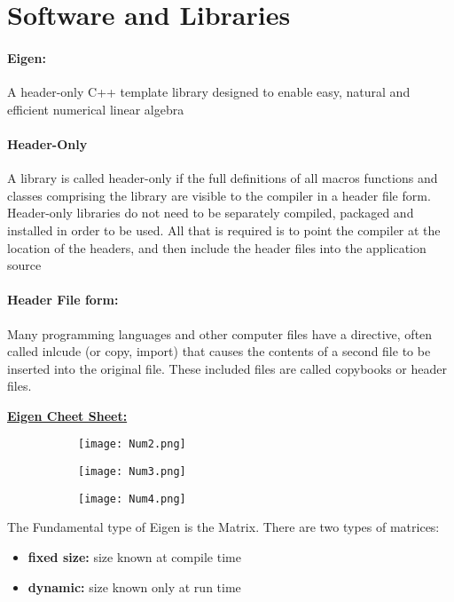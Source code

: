 \documentclass[8pt]{extreport}
\begin{document}
\section{Software and Libraries}

\paragraph{Eigen:} A header-only C++ template library designed to enable easy, natural and efficient numerical linear algebra

\paragraph{Header-Only} A library is called header-only if the full definitions of all macros functions and classes comprising the library are visible to the compiler in a header file form. Header-only libraries do not need to be separately compiled, packaged and installed in order to be used. All that is required is to point the compiler at the location of the headers, and then include the header files into the application source

\paragraph{Header File form:} Many programming languages and other computer files have a directive, often called inlcude (or copy, import) that causes the contents of a second file to be inserted into the original file. These included files are called copybooks or header files.


\textbf{\underline{Eigen Cheet Sheet:}}
\begin{figure}[H]
\centering
\begin{subfigure}[b]{0.99\linewidth}
\texttt{[image: Num2.png]}
\end{subfigure}
\begin{subfigure}[b]{0.99\linewidth}
\texttt{[image: Num3.png]}
\end{subfigure}
\begin{subfigure}[b]{0.99\linewidth}
\texttt{[image: Num4.png]}
\end{subfigure}
\end{figure}

The Fundamental type of Eigen is the Matrix. There are two types of matrices:
\begin{itemize}
\item \textbf{fixed size:} size known at compile time
\item \textbf{dynamic:} size known only at run time
\end{itemize}
\end{document}
